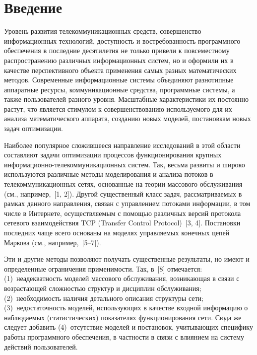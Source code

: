       \begin{multicols}{2}
      
            \label{st\stat}

\section{Введение}
  
  Уровень развития телекоммуникационных средств, совершенство информационных 
технологий, доступность и востребованность программного обеспечения в последние 
десятилетия не только привели к повсеместному распространению различных 
информационных сис\-тем, но и оформили их в качестве перспективного объекта применения 
самых разных математических методов. Современные информационные сис\-те\-мы 
объединяют разнотипные аппаратные ресурсы, коммуникационные средства, программные 
сис\-те\-мы, а также пользователей разного уровня. Масштабные характеристики их постоянно 
растут, что является стимулом к совершенствованию используемого для их 
анализа математического аппарата, созданию новых моделей, постановкам новых задач 
оптимизации.
  
  Наиболее популярное сложившееся направление исследований в этой области составляют 
задачи оптимизации процессов функционирования крупных 
  ин\-фор\-ма\-ци\-он\-но-те\-ле\-ком\-му\-ни\-ка\-ци\-он\-ных сис\-тем. Так, весьма развиты 
и широко используются различные методы моделирования и анализа потоков в 
телекоммуникационных сетях, основанные на теории массового обслуживания (см., 
например,~[1, 2]). Другой существенный класс задач, рассматриваемых в рамках данного 
направления, связан с управлением потоками информации, в том числе в Интернете, 
осуществляемым с помощью различных версий протокола сетевого взаимодействия TCP 
(Transfer Control Protocol)~[3, 4]. Постановки последних чаще всего основаны на моделях 
управляемых конечных цепей Маркова (см., например,~[5--7]).
  
  Эти и другие методы позволяют получать существенные результаты, но имеют и 
определенные ограничения применимости. Так, в~[8] отмечается: (1)~неадекватность 
моделей массового обслуживания, возникающая в связи с возрастающей слож\-ностью 
структур и дисциплин обслуживания; (2)~необходимость наличия детального описания 
структуры сети; (3)~недостаточность моделей, использующих в качестве входной 
информацию о наблюдаемых (статистических) показателях функционирования сети. Сюда 
же следует добавить (4)~отсутствие моделей и постановок, учитывающих специфику работы 
программного обеспечения, в частности в связи с влиянием на сис\-те\-му действий 
пользователей.
  

\end{multicols}
